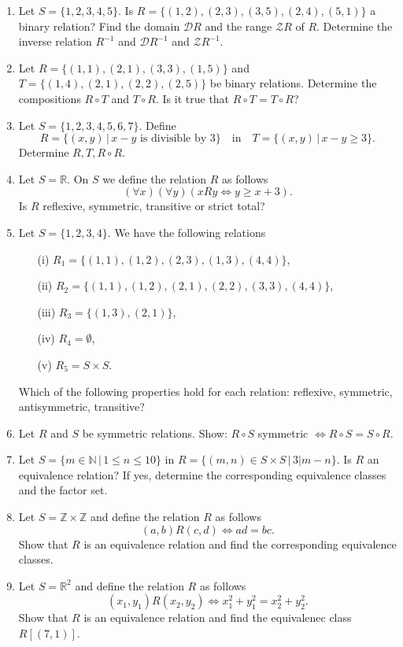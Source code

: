\documentclass[11pt,paper=b5,footinclude,headinclude]{scrbook} %
\theoremstyle{remark}
\theoremstyle{definition} %
\theoremstyle{theorem} %
\begin{document}
\begin{enumerate}


\item Let $S=\{1,2,3,4,5\}$. Is $R=\{(1,2),(2,3), (3,5), (2,4), (5,1)\}$ a binary relation? Find the domain $\mathcal{D} R$ and the range $\mathcal{Z} R$ of $R$. Determine the inverse relation $R^{-1}$ and  $\mathcal{D} R^{-1}$ and  $\mathcal{Z} R^{-1}$.

\item Let $R=\{(1,1),(2,1), (3,3), (1,5)\}$  and $T=\{(1,4),(2,1), (2,2), (2,5)\}$ be binary relations. Determine the compositions $R\circ T$ and $T\circ R$. Is it true that $R\circ T = T \circ R$?

\item Let  $S=\{1,2,3,4,5,6,7\}$. Define
$$R= \{(x,y)\,|\, x-y \textrm{ is divisible by  }  3\} \quad \mathrm{ in } \quad  T= \{(x,y)\,|\, x-y \geq 3\}.$$
Determine $R,T, R\circ R$.


\item Let  $S= \mathbb{R}$. On $S$ we define the relation $R$ as follows
$$(\forall x)(\forall y)(x R y \Leftrightarrow y \geq x +3).$$
Is $R$ reflexive, symmetric, transitive or strict total?

\item Let  $S=\{1,2,3,4\}$. We have the following relations
\begin{enumerate}
\item[(i)] $R_1= \{(1,1),(1,2),(2,3), (1,3), (4,4)\}$,
\item[(ii)] $R_2= \{(1,1),(1,2),(2,1), (2,2), (3,3), (4,4)\}$,
\item[(iii)] $R_3= \{(1,3),(2,1)\}$,
\item[(iv)] $R_4= \emptyset$,
\item[(v)] $R_5= S\times S$.
\end{enumerate}
Which of the following properties hold for each relation: reflexive, symmetric, antisymmetric, transitive?

\item Let $R$ and $S$ be symmetric relations. Show: $R\circ S$ symmetric $\Leftrightarrow R\circ S = S \circ R$.

\item Let $S= \{m\in \mathbb{N}\,|\, 1\leq n \leq 10\}$ in $R=\{(m,n)\in S\times S\,|\, 3|m-n\}$.
Is $R$ an equivalence relation? If yes, determine the corresponding equivalence classes and the factor set.

\item Let $S = \mathbb{Z}\times \mathbb{Z}$ and define the relation $R$ as follows
$$(a,b)R(c,d)\Leftrightarrow ad = bc.$$
Show that $R$ is an equivalence relation  and find the corresponding equivalence classes.

\item Let  $S =  \mathbb{R}^2$ and define the relation $R$ as follows
$$(x_1,y_1)R(x_2,y_2)\Leftrightarrow x_1^2 + y_1^2 = x_2^2 + y_2^2.$$
Show that $R$ is an equivalence relation  and find the equivalenec class $R[(7,1)]$.



\end{enumerate}
\end{document}
